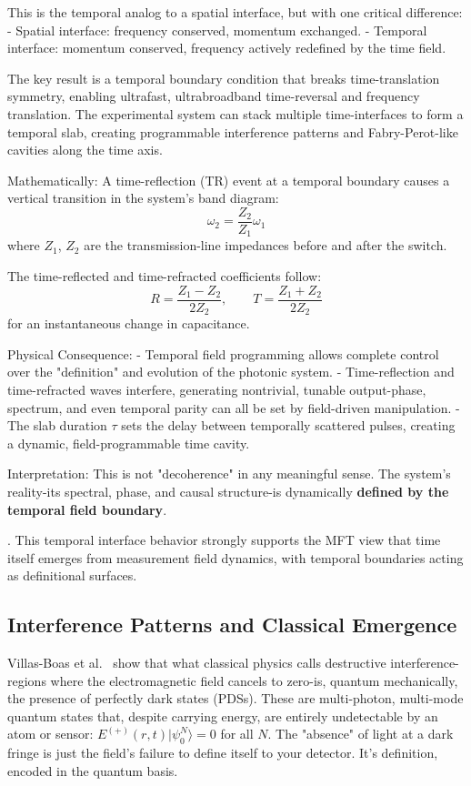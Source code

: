This is the temporal analog to a spatial interface, but with one critical difference:  
- Spatial interface: frequency conserved, momentum exchanged.
- Temporal interface: momentum conserved, frequency actively redefined by the time field.

The key result is a temporal boundary condition that breaks time-translation symmetry, enabling ultrafast, ultrabroadband time-reversal and frequency translation. The experimental system can stack multiple time-interfaces to form a temporal slab, creating programmable interference patterns and Fabry-Perot-like cavities along the time axis.

Mathematically:  
A time-reflection (TR) event at a temporal boundary causes a vertical transition in the system's band diagram:
\[
\omega_2 = \frac{Z_2}{Z_1} \omega_1
\]
where $Z_1$, $Z_2$ are the transmission-line impedances before and after the switch.

The time-reflected and time-refracted coefficients follow:
\[
R = \frac{Z_1 - Z_2}{2 Z_2}, \qquad T = \frac{Z_1 + Z_2}{2 Z_2}
\]
for an instantaneous change in capacitance.

Physical Consequence:  
- Temporal field programming allows complete control over the "definition" and evolution of the photonic system.
- Time-reflection and time-refracted waves interfere, generating nontrivial, tunable output-phase, spectrum, and even temporal parity can all be set by field-driven manipulation.
- The slab duration $\tau$ sets the delay between temporally scattered pulses, creating a dynamic, field-programmable time cavity.

Interpretation:  
This is not "decoherence" in any meaningful sense. The system's reality-its spectral, phase, and causal structure-is dynamically \textbf{defined by the temporal field boundary}.

\cite{moussa_observation_2023}. This temporal interface behavior strongly supports the MFT view that time itself emerges from measurement field dynamics, with temporal boundaries acting as definitional surfaces.

\subsection{Interference Patterns and Classical Emergence}

Villas-Boas et al.~\cite{villas-boas_bright_2025} show that what classical physics calls destructive interference-regions where the electromagnetic field cancels to zero-is, quantum mechanically, the presence of perfectly dark states (PDSs). These are multi-photon, multi-mode quantum states that, despite carrying energy, are entirely undetectable by an atom or sensor: $E^{(+)}(r, t)|\psi^{N}_0\rangle = 0$ for all $N$. The "absence" of light at a dark fringe is just the field's failure to define itself to your detector. It's definition, encoded in the quantum basis.

